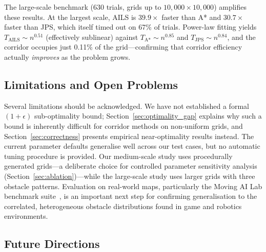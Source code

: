 \documentclass[journal]{IEEEtran}
\begin{document}
The large-scale benchmark (630 trials, grids up to $10{,}000{\times}10{,}000$) amplifies these results.
At the largest scale, AILS is $39.9{\times}$ faster than A* and $30.7{\times}$ faster than JPS, which itself timed out on 67\% of trials.
Power-law fitting yields $T_{\text{AILS}} \sim n^{0.51}$ (effectively sublinear) against $T_{\text{A*}} \sim n^{0.85}$ and $T_{\text{JPS}} \sim n^{0.84}$, and the corridor occupies just 0.11\% of the grid---confirming that corridor efficiency actually \emph{improves} as the problem grows.

\subsection{Limitations and Open Problems}

Several limitations should be acknowledged.
We have not established a formal $(1{+}\epsilon)$ sub-optimality bound; Section~\ref{sec:optimality_gap} explains why such a bound is inherently difficult for corridor methods on non-uniform grids, and Section~\ref{sec:correctness} presents empirical near-optimality results instead.
The current parameter defaults generalise well across our test cases, but no automatic tuning procedure is provided.
Our medium-scale study uses procedurally generated grids---a deliberate choice for controlled parameter sensitivity analysis (Section~\ref{sec:ablation})---while the large-scale study uses larger grids with three obstacle patterns.
Evaluation on real-world maps, particularly the Moving AI Lab benchmark suite~\cite{sturtevant2012benchmarks}, is an important next step for confirming generalisation to the correlated, heterogeneous obstacle distributions found in game and robotics environments.

\subsection{Future Directions}
\end{document}
